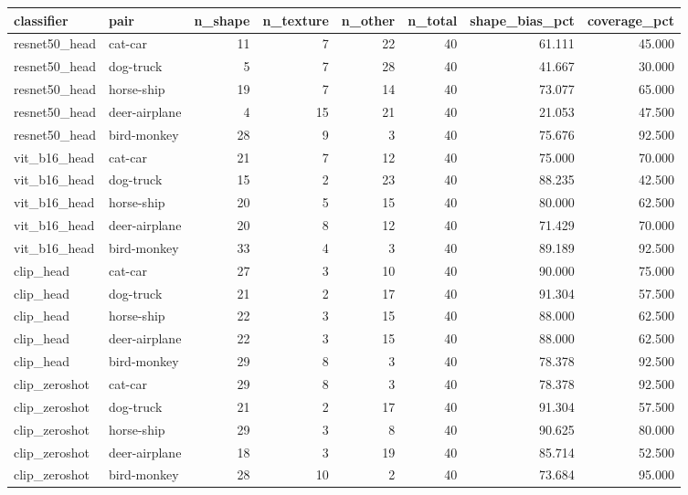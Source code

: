 \begin{tabular}{llrrrrrr}
\toprule
classifier & pair & n_shape & n_texture & n_other & n_total & shape_bias_pct & coverage_pct \\
\midrule
resnet50_head & cat-car & 11 & 7 & 22 & 40 & 61.111 & 45.000 \\
resnet50_head & dog-truck & 5 & 7 & 28 & 40 & 41.667 & 30.000 \\
resnet50_head & horse-ship & 19 & 7 & 14 & 40 & 73.077 & 65.000 \\
resnet50_head & deer-airplane & 4 & 15 & 21 & 40 & 21.053 & 47.500 \\
resnet50_head & bird-monkey & 28 & 9 & 3 & 40 & 75.676 & 92.500 \\
vit_b16_head & cat-car & 21 & 7 & 12 & 40 & 75.000 & 70.000 \\
vit_b16_head & dog-truck & 15 & 2 & 23 & 40 & 88.235 & 42.500 \\
vit_b16_head & horse-ship & 20 & 5 & 15 & 40 & 80.000 & 62.500 \\
vit_b16_head & deer-airplane & 20 & 8 & 12 & 40 & 71.429 & 70.000 \\
vit_b16_head & bird-monkey & 33 & 4 & 3 & 40 & 89.189 & 92.500 \\
clip_head & cat-car & 27 & 3 & 10 & 40 & 90.000 & 75.000 \\
clip_head & dog-truck & 21 & 2 & 17 & 40 & 91.304 & 57.500 \\
clip_head & horse-ship & 22 & 3 & 15 & 40 & 88.000 & 62.500 \\
clip_head & deer-airplane & 22 & 3 & 15 & 40 & 88.000 & 62.500 \\
clip_head & bird-monkey & 29 & 8 & 3 & 40 & 78.378 & 92.500 \\
clip_zeroshot & cat-car & 29 & 8 & 3 & 40 & 78.378 & 92.500 \\
clip_zeroshot & dog-truck & 21 & 2 & 17 & 40 & 91.304 & 57.500 \\
clip_zeroshot & horse-ship & 29 & 3 & 8 & 40 & 90.625 & 80.000 \\
clip_zeroshot & deer-airplane & 18 & 3 & 19 & 40 & 85.714 & 52.500 \\
clip_zeroshot & bird-monkey & 28 & 10 & 2 & 40 & 73.684 & 95.000 \\
\bottomrule
\end{tabular}
